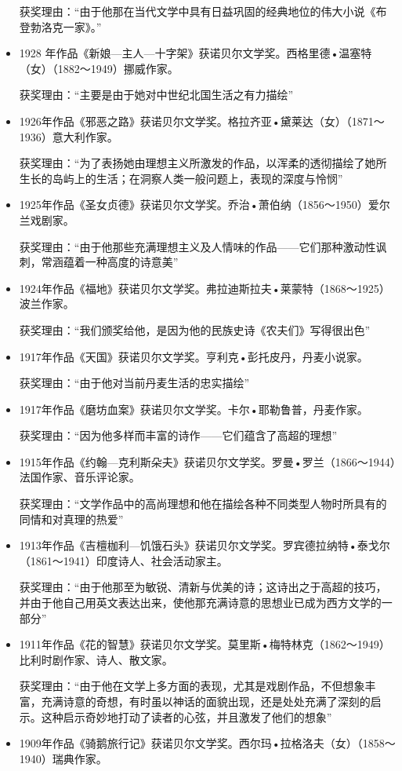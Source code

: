 \documentclass[UTF8,a4paper,8pt]{ctexart}
\begin{document}
\begin{itemize}
			获奖理由：“由于他那在当代文学中具有日益巩固的经典地位的伟大小说《布登勃洛克一家》。”
			\item 1928 年作品《新娘—主人—十字架》获诺贝尔文学奖。西格里德•温塞特（女）（1882～1949）挪威作家。
			
			获奖理由：“主要是由于她对中世纪北国生活之有力描绘”
			\item 1926年作品《邪恶之路》获诺贝尔文学奖。格拉齐亚•黛莱达（女）（1871～1936）意大利作家。
			
			获奖理由：“为了表扬她由理想主义所激发的作品，以浑柔的透彻描绘了她所生长的岛屿上的生活；在洞察人类一般问题上，表现的深度与怜悯”
			\item 1925年作品《圣女贞德》获诺贝尔文学奖。乔治•萧伯纳（1856～1950）爱尔兰戏剧家。
		
			获奖理由：“由于他那些充满理想主义及人情味的作品——它们那种激动性讽刺，常涵蕴着一种高度的诗意美”
			\item 1924年作品《福地》获诺贝尔文学奖。弗拉迪斯拉夫•莱蒙特（1868～1925）波兰作家。
		
			获奖理由：“我们颁奖给他，是因为他的民族史诗《农夫们》写得很出色”
			\item 1917年作品《天国》获诺贝尔文学奖。亨利克•彭托皮丹，丹麦小说家。
		
			获奖理由：“由于他对当前丹麦生活的忠实描绘”
			\item 1917年作品《磨坊血案》获诺贝尔文学奖。卡尔•耶勒鲁普，丹麦作家。
		
			获奖理由：“因为他多样而丰富的诗作——它们蕴含了高超的理想”
			\item 1915年作品《约翰—克利斯朵夫》获诺贝尔文学奖。罗曼•罗兰（1866～1944）法国作家、音乐评论家。
		
			获奖理由：“文学作品中的高尚理想和他在描绘各种不同类型人物时所具有的同情和对真理的热爱”
			\item 1913年作品《吉檀枷利—饥饿石头》获诺贝尔文学奖。罗宾德拉纳特•泰戈尔（1861～1941）印度诗人、社会活动家主。
		
			获奖理由：“由于他那至为敏锐、清新与优美的诗；这诗出之于高超的技巧，并由于他自己用英文表达出来，使他那充满诗意的思想业已成为西方文学的一部分”
			\item 1911年作品《花的智慧》获诺贝尔文学奖。莫里斯•梅特林克（1862～1949）比利时剧作家、诗人、散文家。
		
			获奖理由：“由于他在文学上多方面的表现，尤其是戏剧作品，不但想象丰富，充满诗意的奇想，有时虽以神话的面貌出现，还是处处充满了深刻的启示。这种启示奇妙地打动了读者的心弦，并且激发了他们的想象”
			\item 1909年作品《骑鹅旅行记》获诺贝尔文学奖。西尔玛•拉格洛夫（女）（1858～1940）瑞典作家。
		

\end{itemize}
\end{document}

